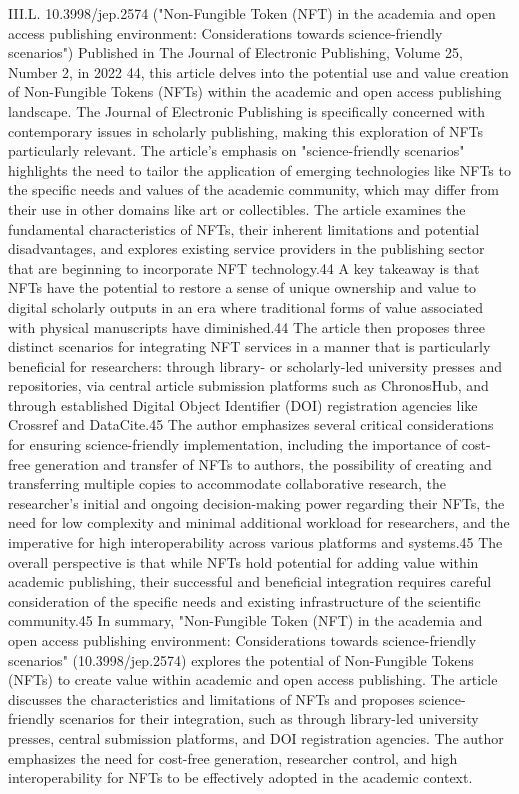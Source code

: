 \documentclass{article}
\begin{document}
III.L. 10.3998/jep.2574 ("Non-Fungible Token (NFT) in the academia and open access publishing environment: Considerations towards science-friendly scenarios")
Published in The Journal of Electronic Publishing, Volume 25, Number 2, in 2022 44, this article delves into the potential use and value creation of Non-Fungible Tokens (NFTs) within the academic and open access publishing landscape. The Journal of Electronic Publishing is specifically concerned with contemporary issues in scholarly publishing, making this exploration of NFTs particularly relevant. The article's emphasis on "science-friendly scenarios" highlights the need to tailor the application of emerging technologies like NFTs to the specific needs and values of the academic community, which may differ from their use in other domains like art or collectibles. The article examines the fundamental characteristics of NFTs, their inherent limitations and potential disadvantages, and explores existing service providers in the publishing sector that are beginning to incorporate NFT technology.44 A key takeaway is that NFTs have the potential to restore a sense of unique ownership and value to digital scholarly outputs in an era where traditional forms of value associated with physical manuscripts have diminished.44 The article then proposes three distinct scenarios for integrating NFT services in a manner that is particularly beneficial for researchers: through library- or scholarly-led university presses and repositories, via central article submission platforms such as ChronosHub, and through established Digital Object Identifier (DOI) registration agencies like Crossref and DataCite.45 The author emphasizes several critical considerations for ensuring science-friendly implementation, including the importance of cost-free generation and transfer of NFTs to authors, the possibility of creating and transferring multiple copies to accommodate collaborative research, the researcher's initial and ongoing decision-making power regarding their NFTs, the need for low complexity and minimal additional workload for researchers, and the imperative for high interoperability across various platforms and systems.45 The overall perspective is that while NFTs hold potential for adding value within academic publishing, their successful and beneficial integration requires careful consideration of the specific needs and existing infrastructure of the scientific community.45
In summary, "Non-Fungible Token (NFT) in the academia and open access publishing environment: Considerations towards science-friendly scenarios" (10.3998/jep.2574) explores the potential of Non-Fungible Tokens (NFTs) to create value within academic and open access publishing. The article discusses the characteristics and limitations of NFTs and proposes science-friendly scenarios for their integration, such as through library-led university presses, central submission platforms, and DOI registration agencies. The author emphasizes the need for cost-free generation, researcher control, and high interoperability for NFTs to be effectively adopted in the academic context.
\end{document}
